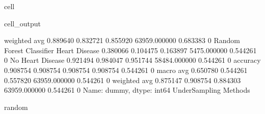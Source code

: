 \documentclass[letterpaper,10pt,english]{jupyterBook}
\begin{document}
\begin{sphinxuseclass}{cell}
\begin{sphinxVerbatimOutput}
\begin{sphinxuseclass}{cell_output}
\begin{sphinxVerbatim}[commandchars=\\\{\}]
                           weighted avg      0.889640   0.832721  0.855920  63959.000000  0.683383    0
Random Forest Classifier   Heart Disease     0.380066   0.104475  0.163897  5475.000000   0.544261    0
                           No Heart Disease  0.921494   0.984047  0.951744  58484.000000  0.544261    0
                           accuracy          0.908754   0.908754  0.908754  0.908754      0.544261    0
                           macro avg         0.650780   0.544261  0.557820  63959.000000  0.544261    0
                           weighted avg      0.875147   0.908754  0.884303  63959.000000  0.544261    0
Name: dummy, dtype: int64
UnderSampling Methods
\PYGZhy{}\PYGZhy{}\PYGZhy{}\PYGZhy{}\PYGZhy{}\PYGZhy{}\PYGZhy{}\PYGZhy{}\PYGZhy{}\PYGZhy{}\PYGZhy{}\PYGZhy{}\PYGZhy{}\PYGZhy{}\PYGZhy{}\PYGZhy{}\PYGZhy{}\PYGZhy{}\PYGZhy{}

random
\PYGZhy{}\PYGZhy{}\PYGZhy{}\PYGZhy{}\PYGZhy{}\PYGZhy{}\PYGZhy{}\PYGZhy{}\PYGZhy{}\PYGZhy{}\PYGZhy{}\PYGZhy{}\PYGZhy{}\PYGZhy{}\PYGZhy{}\PYGZhy{}\PYGZhy{}\PYGZhy{}\PYGZhy{}
\end{sphinxVerbatim}

\noindent{}


\end{sphinxuseclass}
\end{sphinxVerbatimOutput}
\end{sphinxuseclass}
\end{document}
